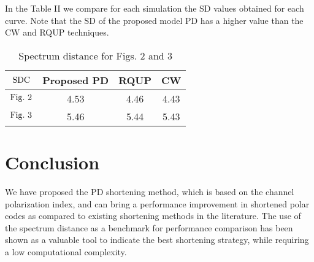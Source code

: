 \documentclass[10pt,twocolumn]{IEEEtran}
\begin{document}
In the Table II we compare for each simulation the SD values
obtained for each curve. Note that the SD of the proposed model PD
has a higher value than the CW and RQUP techniques.


\begin{table}[htb]
\caption{\label{tabela}Spectrum distance for Figs. 2 and 3}
\begin{center} \footnotesize
\begin{tabular}{|c||c|c|c|}\hline
\textit{$\rm SDC$}&Proposed PD &
RQUP\cite{Niu}&CW\cite{Wang}\\\hline \textit{$\rm Fig.
~2$}&4.53&4.46&4.43\\\hline \textit{$\rm Fig.
~3$}&5.46&5.44&5.43\\\hline
\end{tabular}
\end{center}
\end{table}

\section{Conclusion}

We have proposed the PD shortening method, which is based on the
channel polarization index, and can bring a performance improvement
in shortened polar codes as compared to existing shortening methods
in the literature. The use of the spectrum distance as a benchmark
for performance comparison has been shown as a valuable tool to
indicate the best shortening strategy, while requiring a low
computational complexity.
\end{document}
